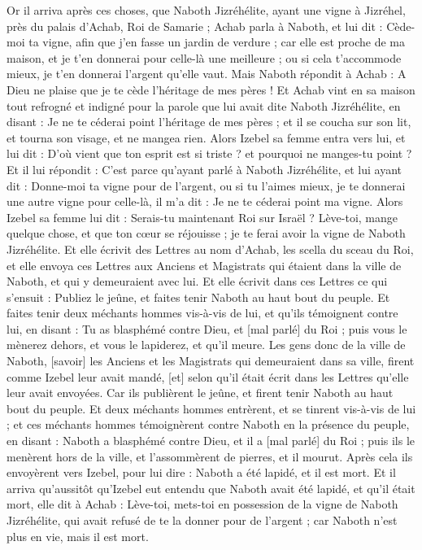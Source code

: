 \begin{multicols}{2}
\VerseOne{}Or il arriva après ces choses, que Naboth Jizréhélite, ayant une vigne à Jizréhel, près du palais d'Achab, Roi de Samarie ;
Achab parla à Naboth, et lui dit : Cède-moi ta vigne, afin que j'en fasse un jardin de verdure ; car elle est proche de ma maison, et je t'en donnerai pour celle-là une meilleure ; ou si cela t'accommode mieux, je t'en donnerai l'argent qu'elle vaut.
Mais Naboth répondit à Achab : A Dieu ne plaise que je te cède l'héritage de mes pères !
Et Achab vint en sa maison tout refrogné et indigné pour la parole que lui avait dite Naboth Jizréhélite, en disant : Je ne te céderai point l'héritage de mes pères ; et il se coucha sur son lit, et tourna son visage, et ne mangea rien.
Alors Izebel sa femme entra vers lui, et lui dit : D'où vient que ton esprit est si triste ? et pourquoi ne manges-tu point ?
Et il lui répondit : C'est parce qu'ayant parlé à Naboth Jizréhélite, et lui ayant dit : Donne-moi ta vigne pour de l'argent, ou si tu l'aimes mieux, je te donnerai une autre vigne pour celle-là, il m'a dit : Je ne te céderai point ma vigne.
Alors Izebel sa femme lui dit : Serais-tu maintenant Roi sur Israël ? Lève-toi, mange quelque chose, et que ton cœur se réjouisse ; je te ferai avoir la vigne de Naboth Jizréhélite.
Et elle écrivit des Lettres au nom d'Achab, les scella du sceau du Roi, et elle envoya ces Lettres aux Anciens et Magistrats qui étaient dans la ville de Naboth, et qui y demeuraient avec lui.
Et elle écrivit dans ces Lettres ce qui s'ensuit : Publiez le jeûne, et faites tenir Naboth au haut bout du peuple.
Et faites tenir deux méchants hommes vis-à-vis de lui, et qu'ils témoignent contre lui, en disant : Tu as blasphémé contre Dieu, et [mal parlé] du Roi ; puis vous le mènerez dehors, et vous le lapiderez, et qu'il meure.
Les gens donc de la ville de Naboth, [savoir] les Anciens et les Magistrats qui demeuraient dans sa ville, firent comme Izebel leur avait mandé, [et] selon qu'il était écrit dans les Lettres qu'elle leur avait envoyées.
Car ils publièrent le jeûne, et firent tenir Naboth au haut bout du peuple.
Et deux méchants hommes entrèrent, et se tinrent vis-à-vis de lui ; et ces méchants hommes témoignèrent contre Naboth en la présence du peuple, en disant : Naboth a blasphémé contre Dieu, et il a [mal parlé] du Roi ; puis ils le menèrent hors de la ville, et l'assommèrent de pierres, et il mourut.
Après cela ils envoyèrent vers Izebel, pour lui dire : Naboth a été lapidé, et il est mort.
Et il arriva qu'aussitôt qu'Izebel eut entendu que Naboth avait été lapidé, et qu'il était mort, elle dit à Achab : Lève-toi, mets-toi en possession de la vigne de Naboth Jizréhélite, qui avait refusé de te la donner pour de l'argent ; car Naboth n'est plus en vie, mais il est mort.

\end{multicols}
